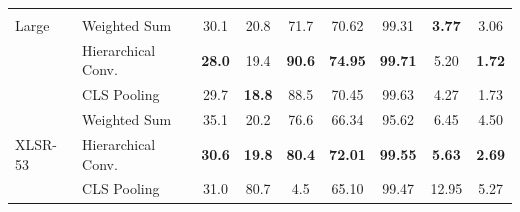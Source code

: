\begin{table}[th]
\begin{tabular}{ l l c c c c c c c }
    \multirowcell{ 3}{WavLM\\Large} 
    &  Weighted Sum  &	30.1 & 20.8 & 71.7 & 70.62 & 99.31 & \textbf{3.77} & 3.06\\
    &  Hierarchical Conv.  &	\textbf{28.0} & 19.4 & \textbf{90.6} & \textbf{74.95} & \textbf{99.71} & 5.20 & \textbf{1.72}\\
    &  CLS Pooling &	29.7 & \textbf{18.8} & 88.5 & 70.45 & 99.63 & 4.27 & 1.73 \\
    \midrule

    \multirow{ 3}{*}{XLSR-53} 
    &  Weighted Sum  &	35.1 & 20.2 & 76.6 & 66.34 & 95.62 & 6.45 & 4.50\\
    &  Hierarchical Conv.  &	\textbf{30.6} & \textbf{19.8} & \textbf{80.4} & \textbf{72.01} & \textbf{99.55} & \textbf{5.63} & \textbf{2.69}\\
    &  CLS Pooling &	31.0 & 80.7 & 4.5 & 65.10 & 99.47 & 12.95 & 5.27\\   

    \bottomrule
  \end{tabular}
  \vspace{-10pt}
\end{table}

